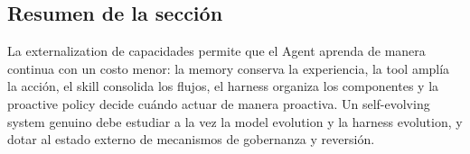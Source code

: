 
\subsection{Resumen de la sección}

La externalization de capacidades permite que el Agent aprenda de manera continua con un costo menor: la memory conserva la experiencia, la tool amplía la acción, el skill consolida los flujos, el harness organiza los componentes y la proactive policy decide cuándo actuar de manera proactiva. Un self-evolving system genuino debe estudiar a la vez la model evolution y la harness evolution, y dotar al estado externo de mecanismos de gobernanza y reversión.
